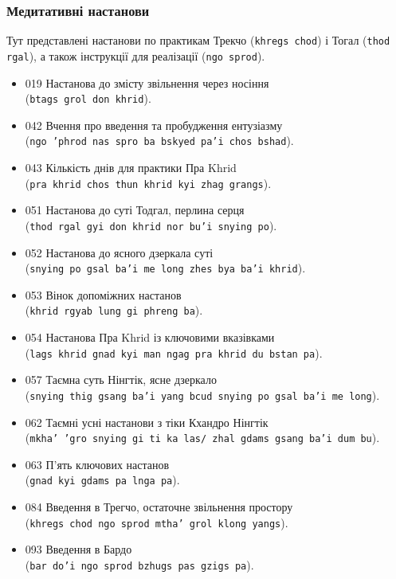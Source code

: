 \documentclass{article}
\begin{document}
\subsubsection{Медитативні настанови}

Тут представлені настанови по практикам Трекчо (\texttt{khregs chod}) і Тогал (\texttt{thod rgal}),
а також інструкції для реалізації (\texttt{ngo sprod}).

\begingroup\raggedright
\begin{itemize}
\item 019 Настанова до змісту звільнення через носіння \\ (\texttt{btags grol don khrid}).
\item 042 Вчення про введення та пробудження ентузіазму \\ (\texttt{ngo 'phrod nas spro ba bskyed pa'i chos bshad}).
\item 043 Кількість днів для практики Пра Khrid \\ (\texttt{pra khrid chos thun khrid kyi zhag grangs}).
\item 051 Настанова до суті Тодгал, перлина серця \\ (\texttt{thod rgal gyi don khrid nor bu'i snying po}).
\item 052 Настанова до ясного дзеркала суті \\ (\texttt{snying po gsal ba'i me long zhes bya ba'i khrid}).
\item 053 Вінок допоміжних настанов \\ (\texttt{khrid rgyab lung gi phreng ba}).
\item 054 Настанова Пра Khrid із ключовими вказівками \\ (\texttt{lags khrid gnad kyi man ngag pra khrid du bstan pa}).
\item 057 Таємна суть Нінгтік, ясне дзеркало \\ (\texttt{snying thig gsang ba'i yang bcud snying po gsal ba'i me long}).
\item 062 Таємні усні настанови з тіки Кхандро Нінгтік \\ (\texttt{mkha' 'gro snying gi ti ka las/ zhal gdams gsang ba'i dum bu}).
\item 063 П’ять ключових настанов \\ (\texttt{gnad kyi gdams pa lnga pa}).
\item 084 Введення в Трегчо, остаточне звільнення простору \\ (\texttt{khregs chod ngo sprod mtha' grol klong yangs}).
\item 093 Введення в Бардо \\ (\texttt{bar do'i ngo sprod bzhugs pas gzigs pa}).

\end{itemize}
\end{document}
